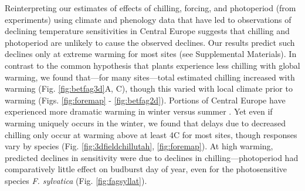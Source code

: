 \documentclass{article}
\begin{document}

\par Reinterpreting our estimates of effects of chilling, forcing, and photoperiod (from experiments) using climate and phenology data that have led to observations of declining temperature sensitivities in Central Europe suggests that chilling and photoperiod are unlikely to cause the observed declines. Our results predict such declines only at extreme warming for most sites (see Supplemental Materials). In contrast to the common hypothesis that plants experience less chilling with global warming, we found that---for many sites---total estimated chilling increased with warming (Fig. \ref{fig:betfag3d}A, C), though this varied with local climate prior to warming (Figs. \ref{fig:foremap} - \ref{fig:betfag2d}). 
Portions of Central Europe have experienced more dramatic warming in winter versus summer \emph{\citep[][]{li2015,balling1998}}. Yet even if warming uniquely occurs in the winter, we found that delays due to decreased chilling only occur at warming above at least 4\degree C for most sites, though responses vary by species (Fig. \ref{fig:3dfieldchillutah}, \ref{fig:foremap}). At high warming, predicted declines in sensitivity were due to declines in chilling---photoperiod had comparatively little effect on budburst day of year, even for the photosensitive species \emph{F. sylvatica} (Fig. \ref{fig:fagsyllat}). 
\end{document}
